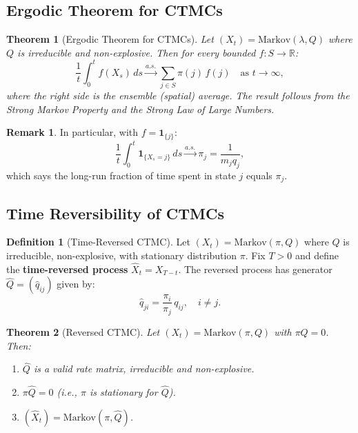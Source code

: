 \documentclass[12pt, a4paper]{article}
\theoremstyle{definition}
\newtheorem{definition}{Definition}[section]
\newtheorem{remark}{Remark}[section]
\theoremstyle{plain}
\newtheorem{theorem}{Theorem}[section]
\newcommand{\RR}{\mathbb{R}}
\begin{document}
\subsection{Ergodic Theorem for CTMCs}

\begin{theorem}[Ergodic Theorem for CTMCs]
Let $(X_t) = \text{Markov}(\lambda, Q)$ where $Q$ is irreducible and non-explosive. Then for every bounded $f: S \to \RR$:
\[
  \frac{1}{t}\int_0^t f(X_s)\,ds \xrightarrow{a.s.} \sum_{j \in S} \pi(j)\,f(j) \quad \text{as } t \to \infty,
\]
where the right side is the ensemble (spatial) average. The result follows from the Strong Markov Property and the Strong Law of Large Numbers.
\end{theorem}

\begin{remark}
In particular, with $f = \mathbf{1}_{\{j\}}$:
\[
  \frac{1}{t}\int_0^t \mathbf{1}_{\{X_s = j\}}\,ds \xrightarrow{a.s.} \pi_j = \frac{1}{m_j q_j},
\]
which says the long-run fraction of time spent in state $j$ equals $\pi_j$.
\end{remark}

\subsection{Time Reversibility of CTMCs}

\begin{definition}[Time-Reversed CTMC]
Let $(X_t) = \text{Markov}(\pi, Q)$ where $Q$ is irreducible, non-explosive, with stationary distribution $\pi$. Fix $T > 0$ and define the \textbf{time-reversed process} $\hat{X}_t = X_{T-t}$. The reversed process has generator $\hat{Q} = (\hat{q}_{ij})$ given by:
\[
  \hat{q}_{ji} = \frac{\pi_i}{\pi_j}\,q_{ij}, \quad i \ne j.
\]
\end{definition}

\begin{theorem}[Reversed CTMC]
Let $(X_t) = \text{Markov}(\pi, Q)$ with $\pi Q = 0$. Then:
\begin{enumerate}[label=(\roman*)]
  \item $\hat{Q}$ is a valid rate matrix, irreducible and non-explosive.
  \item $\pi \hat{Q} = 0$ (i.e., $\pi$ is stationary for $\hat{Q}$).
  \item $(\hat{X}_t) = \text{Markov}(\pi, \hat{Q})$.
\end{enumerate}
\end{theorem}
\end{document}

